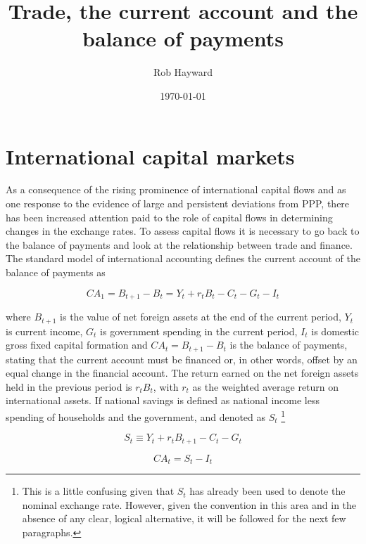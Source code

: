 \documentclass[12pt, a4paper, oneside]{article} %
\begin{document}
\title{Trade, the current account and the balance of payments}
\author{Rob Hayward}
\date{\today}
\maketitle
\section{International capital markets}
As a consequence of the rising prominence of international capital flows and as one response to the evidence of large and persistent deviations from PPP, there has been increased attention paid to the role of capital flows in determining  changes in the exchange rates.  To assess capital flows it is necessary to go back to the balance of payments and look at the relationship between trade and finance.  The standard model of international accounting defines the current account of the balance of payments as   

\begin{equation}\label{currentaccount} 
CA_1=B_{t+1}-B_t=Y_t+r_tB_t-C_t-G_t-I_t 
\end{equation} 

where $B_{t+1}$ is the value of net foreign assets at the end of the current period, $Y_t$ is current income, $G_t$ is government spending in the current period, $I_t$ is domestic gross fixed capital formation and $CA_t=B_{t+1}-B_t$ is the balance of payments, stating that the current account must be financed or, in other words, offset by an equal change in the financial account.  The return earned on the net foreign assets held in the previous period is $r_tB_t$, with $r_t$ as the weighted average return on international assets.  If national savings is defined as national income less spending of households and the government, and denoted as $S_t$ \footnote{This is a little confusing given that $S_t$ has already been used to denote the nominal exchange rate.  However, given the convention in this area and in the absence of any clear, logical alternative, it will be followed for the next few paragraphs.} 

\begin{equation} 
S_t \equiv Y_t+r_tB_{t+1}-C_t-G_t 
\end{equation}


\begin{equation}\label{SI} 
CA_t=S_t-I_t 
\end{equation}  
\end{document}
